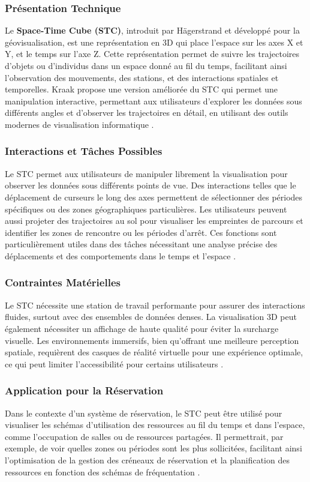 \documentclass[runningheads]{llncs}
\begin{document}
\subsubsection{Présentation Technique}
Le \textbf{Space-Time Cube (STC)}, introduit par Hägerstrand et développé pour la géovisualisation, est une représentation en 3D qui place l’espace sur les axes X et Y, et le temps sur l’axe Z. Cette représentation permet de suivre les trajectoires d’objets ou d’individus dans un espace donné au fil du temps, facilitant ainsi l’observation des mouvements, des stations, et des interactions spatiales et temporelles. Kraak propose une version améliorée du STC qui permet une manipulation interactive, permettant aux utilisateurs d’explorer les données sous différents angles et d’observer les trajectoires en détail, en utilisant des outils modernes de visualisation informatique \cite{bach_review_2014}.

\subsubsection{Interactions et Tâches Possibles}
Le STC permet aux utilisateurs de manipuler librement la visualisation pour observer les données sous différents points de vue. Des interactions telles que le déplacement de curseurs le long des axes permettent de sélectionner des périodes spécifiques ou des zones géographiques particulières. Les utilisateurs peuvent aussi projeter des trajectoires au sol pour visualiser les empreintes de parcours et identifier les zones de rencontre ou les périodes d’arrêt. Ces fonctions sont particulièrement utiles dans des tâches nécessitant une analyse précise des déplacements et des comportements dans le temps et l’espace \cite{bach_review_2014}.

\subsubsection{Contraintes Matérielles}
Le STC nécessite une station de travail performante pour assurer des interactions fluides, surtout avec des ensembles de données denses. La visualisation 3D peut également nécessiter un affichage de haute qualité pour éviter la surcharge visuelle. Les environnements immersifs, bien qu’offrant une meilleure perception spatiale, requièrent des casques de réalité virtuelle pour une expérience optimale, ce qui peut limiter l’accessibilité pour certains utilisateurs \cite{kraak_space-time_nodate}.

\subsubsection{Application pour la Réservation}
Dans le contexte d’un système de réservation, le STC peut être utilisé pour visualiser les schémas d’utilisation des ressources au fil du temps et dans l’espace, comme l’occupation de salles ou de ressources partagées. Il permettrait, par exemple, de voir quelles zones ou périodes sont les plus sollicitées, facilitant ainsi l’optimisation de la gestion des créneaux de réservation et la planification des ressources en fonction des schémas de fréquentation \cite{bach_review_2014}.
\end{document}
